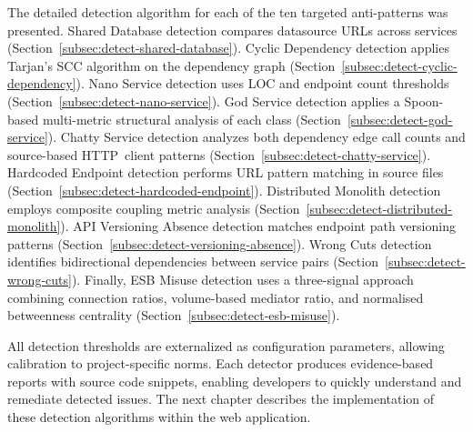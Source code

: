 The detailed detection algorithm for each of the ten targeted anti-patterns was presented. Shared Database detection compares datasource URLs across services (Section~\ref{subsec:detect-shared-database}). Cyclic Dependency detection applies Tarjan's SCC algorithm on the dependency graph (Section~\ref{subsec:detect-cyclic-dependency}). Nano Service detection uses LOC and endpoint count thresholds (Section~\ref{subsec:detect-nano-service}). God Service detection applies a Spoon-based multi-metric structural analysis of each class (Section~\ref{subsec:detect-god-service}). Chatty Service detection analyzes both dependency edge call counts and source-based HTTP~client patterns (Section~\ref{subsec:detect-chatty-service}). Hardcoded Endpoint detection performs URL pattern matching in source files (Section~\ref{subsec:detect-hardcoded-endpoint}). Distributed Monolith detection employs composite coupling metric analysis (Section~\ref{subsec:detect-distributed-monolith}). API Versioning Absence detection matches endpoint path versioning patterns (Section~\ref{subsec:detect-versioning-absence}).
Wrong Cuts detection identifies bidirectional dependencies between service pairs (Section~\ref{subsec:detect-wrong-cuts}). Finally, ESB Misuse detection uses a three-signal approach combining connection ratios, volume-based mediator ratio, and normalised betweenness centrality (Section~\ref{subsec:detect-esb-misuse}).

All detection thresholds are externalized as configuration parameters, allowing calibration to project-specific norms. Each detector produces evidence-based reports with source code snippets, enabling developers to quickly understand and remediate detected issues. The next chapter describes the implementation of these detection algorithms within the web application.